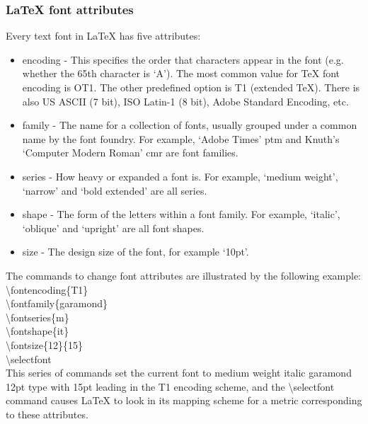 \documentclass{beamer}
\begin{document}
\begin{frame}[fragile]
\frametitle{\LaTeX{} font attributes}
\vspace{-0.4cm}
\footnotesize{Every text font in \LaTeX{} has five attributes:}\\

\begin{itemize}
\item \scriptsize{encoding - This specifies the order that characters appear in the font (e.g. whether the 65th character is `A'). The most common value for TeX font encoding is OT1. The other predefined option is T1 (extended \TeX{}). There is also US ASCII (7 bit), ISO Latin-1 (8 bit), Adobe Standard Encoding, etc.}\\
\item \scriptsize{family - The name for a collection of fonts, usually grouped under a common name by the font foundry. For example, `Adobe Times' ptm and Knuth's `Computer Modern Roman' cmr are font families.}\\
\item \scriptsize{series - How heavy or expanded a font is. For example, `medium weight', `narrow' and `bold extended' are all series.}\\
\item \scriptsize{shape - The form of the letters within a font family. For example, `italic', `oblique' and `upright' are all font shapes.}\\
\item \scriptsize{size - The design size of the font, for example `10pt'.}
\end{itemize}
\vspace{-0.3cm}
\scriptsize{The commands to change font attributes are illustrated by the following example:}\\
\tiny{ 
\textbackslash fontencoding\{T1\}\\
\textbackslash fontfamily\{garamond\}\\
\textbackslash fontseries\{m\}\\
\textbackslash fontshape\{it\}\\
\textbackslash fontsize\{12\}\{15\}\\
\textbackslash selectfont\\
}
\scriptsize{This series of commands set the current font to medium weight italic garamond 12pt type with 15pt leading in the T1 encoding scheme, and the} \tiny{\textbackslash selectfont} \scriptsize{command causes LaTeX to look in its mapping scheme for a metric corresponding to these attributes.}
\end{frame}
\end{document}
